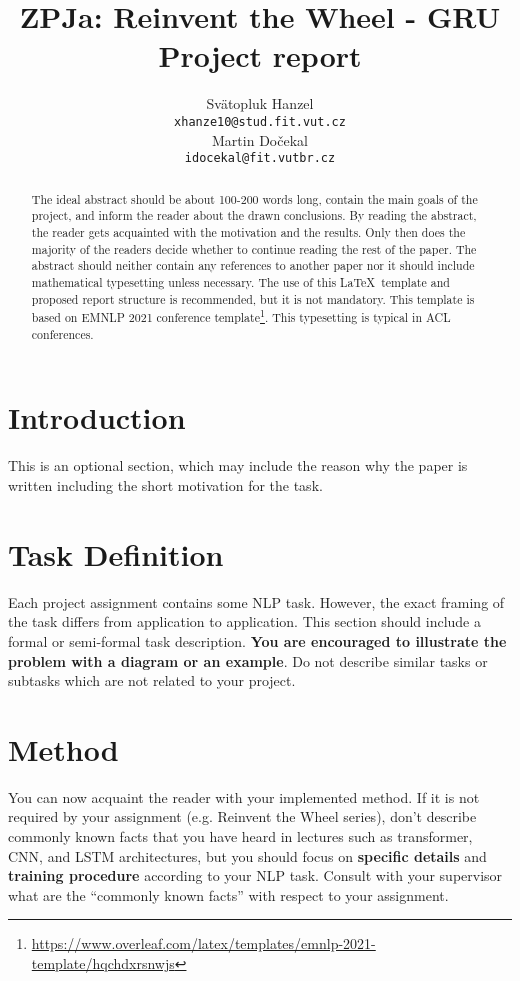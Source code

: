 \documentclass[11pt]{article}
\title{
	ZPJa: Reinvent the Wheel - GRU\\
	\large{Project report}
}
\author{Svätopluk Hanzel \\
  \texttt{xhanze10@stud.fit.vut.cz} \\\And
  Martin Dočekal\\
  \texttt{idocekal@fit.vutbr.cz}
 }
\begin{document}
\maketitle
\begin{abstract}
The ideal abstract should be about 100-200 words long, contain the main goals of the project, and inform the reader about the drawn conclusions. 
By reading the abstract, the reader gets acquainted with the motivation and the results. Only then does the majority of the readers decide whether to continue reading the rest of the paper. 
The abstract should neither contain any references to another paper nor it should include mathematical typesetting unless necessary. The use of this \LaTeX~template and proposed report structure is recommended, but it is not mandatory. This template is based on EMNLP 2021 conference template\footnote{\url{https://www.overleaf.com/latex/templates/emnlp-2021-template/hqchdxrsnwjs}}. This typesetting is typical in ACL conferences.
\end{abstract}

\section{Introduction}
This is an optional section, which may include the reason why the paper is written including the short motivation for the task. 

\section{Task Definition}
Each project assignment contains some NLP task. However, the exact framing of the task differs from application to application. This section should include a formal or semi-formal task description. \textbf{You are encouraged to illustrate the problem with a diagram or an example}.
Do not describe similar tasks or subtasks which are not related to your project. 

\section{Method}
You can now acquaint the reader with your implemented method. 
If it is not required by your assignment (e.g. Reinvent the Wheel series), don't describe commonly known facts that you have heard in lectures such as transformer, CNN, and LSTM architectures, but you should focus on \textbf{specific details} and \textbf{training procedure} according to your NLP task. 
Consult with your supervisor what are the ``commonly known facts'' with respect to your assignment. 
\end{document}
